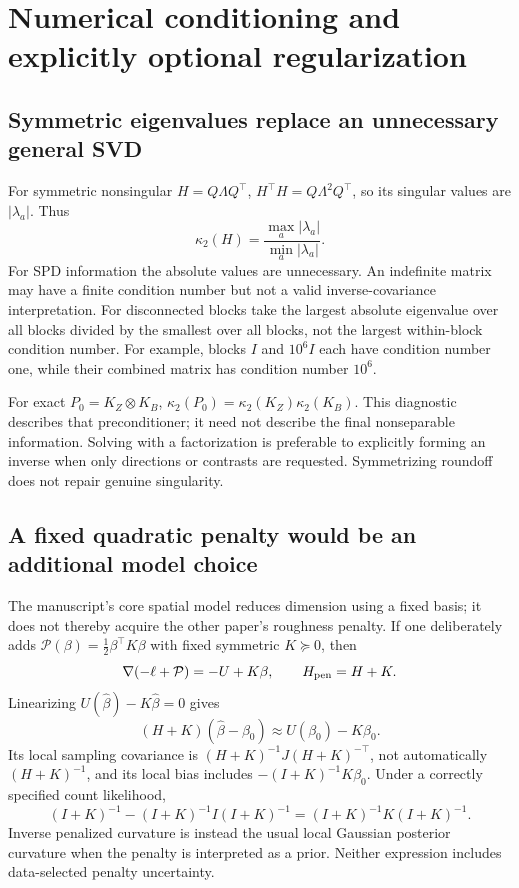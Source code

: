 \documentclass[11pt,a4paper]{article}
\numberwithin{equation}{section}
\begin{document}
\section{Numerical conditioning and explicitly optional regularization}

\subsection{Symmetric eigenvalues replace an unnecessary general SVD}
For symmetric nonsingular $H=Q\Lambda Q^\top$,
$H^\top H=Q\Lambda^2Q^\top$, so its singular values are
$|\lambda_a|$. Thus
\[
 \kappa_2(H)=\frac{\max_a|\lambda_a|}{\min_a|\lambda_a|}.
\]
For SPD information the absolute values are unnecessary.
An indefinite matrix may have a finite condition number but not a
valid inverse-covariance interpretation.
For disconnected blocks take the largest absolute eigenvalue over
all blocks divided by the smallest over all blocks, not the
largest within-block condition number.
For example, blocks $I$ and $10^6I$ each have condition number one,
while their combined matrix has condition number $10^6$.

For exact $P_0=K_Z\otimes K_B$,
$\kappa_2(P_0)=\kappa_2(K_Z)\kappa_2(K_B)$.
This diagnostic describes that preconditioner; it need not describe
the final nonseparable information.
Solving with a factorization is preferable to explicitly forming
an inverse when only directions or contrasts are requested.
Symmetrizing roundoff does not repair genuine singularity.

\subsection{A fixed quadratic penalty would be an additional model choice}
The manuscript's core spatial model reduces dimension using a fixed
basis; it does not thereby acquire the other paper's roughness penalty.
If one deliberately adds $\mathcal P(\beta)=\tfrac12\beta^\top K\beta$
with fixed symmetric $K\succeq0$, then
\[
 \nabla(-\ell+\mathcal P)=-U+K\beta,\qquad
 H_{\rm pen}=H+K.
\]
Linearizing $U(\widehat\beta)-K\widehat\beta=0$ gives
\[
 (H+K)(\widehat\beta-\beta_0)\approx U(\beta_0)-K\beta_0.
\]
Its local sampling covariance is
$(H+K)^{-1}J(H+K)^{-\top}$, not automatically $(H+K)^{-1}$,
and its local bias includes $-(I+K)^{-1}K\beta_0$.
Under a correctly specified count likelihood,
\[
 (I+K)^{-1}-(I+K)^{-1}I(I+K)^{-1}
 =(I+K)^{-1}K(I+K)^{-1}.
\]
Inverse penalized curvature is instead the usual local Gaussian
posterior curvature when the penalty is interpreted as a prior.
Neither expression includes data-selected penalty uncertainty.
\end{document}
